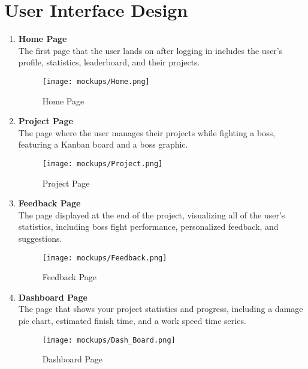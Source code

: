 \section{User Interface Design}
\label{section:user-interface-design}
\begin{enumerate}
    \item \textbf{Home Page} \\
    The first page that the user lands on after logging in includes the user's profile, statistics, leaderboard, and their projects.    
    \begin{figure}[H]
        \centering
        \texttt{[image: mockups/Home.png]}
        \caption{Home Page}
    \end{figure}
    
    \item \textbf{Project Page} \\
        The page where the user manages their projects while fighting a boss, featuring a Kanban board and a boss graphic.    
        \begin{figure}[H]
            \centering
            \texttt{[image: mockups/Project.png]}
            \caption{Project Page}
        \end{figure}
        \newpage

    \item \textbf{Feedback Page} \\
        The page displayed at the end of the project, visualizing all of the user's statistics, including boss fight performance, personalized feedback, and suggestions.    
        \begin{figure}[H]
            \centering
            \texttt{[image: mockups/Feedback.png]}
            \caption{Feedback Page}
        \end{figure}

    \item \textbf{Dashboard Page} \\
    The page that shows your project statistics and progress, including a damage pie chart, estimated finish time, and a work speed time series.    
    \begin{figure}[H]
            \centering
            \texttt{[image: mockups/Dash\_Board.png]}
            \caption{Dashboard Page}
        \end{figure}

\end{enumerate}

